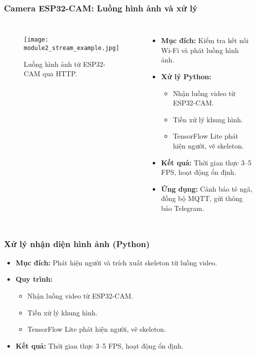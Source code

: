 \begin{frame}[t,fragile]
\frametitle{Camera ESP32-CAM: Luồng hình ảnh và xử lý}
\begin{columns}[T]
    \begin{figure}[H]
        \centering
        \texttt{[image: module2\_stream\_example.jpg]}
        \caption{Luồng hình ảnh từ ESP32-CAM qua HTTP.}
    \end{figure}

    \begin{itemize}
        \item \textbf{Mục đích:} Kiểm tra kết nối Wi-Fi và phát luồng hình ảnh.
        \item \textbf{Xử lý Python:}
        \begin{itemize}
            \item Nhận luồng video từ ESP32-CAM.
            \item Tiền xử lý khung hình.
            \item TensorFlow Lite phát hiện người, vẽ skeleton.
        \end{itemize}
        \item \textbf{Kết quả:} Thời gian thực 3–5 FPS, hoạt động ổn định.
        \item \textbf{Ứng dụng:} Cảnh báo té ngã, đồng bộ MQTT, gửi thông báo Telegram.
    \end{itemize}
\end{columns}
\end{frame}

\begin{frame}[t]
\frametitle{Xử lý nhận diện hình ảnh (Python)}
\begin{itemize}
    \item \textbf{Mục đích:} Phát hiện người và trích xuất skeleton từ luồng video.
    \item \textbf{Quy trình:}
    \begin{itemize}
        \item Nhận luồng video từ ESP32-CAM.
        \item Tiền xử lý khung hình.
        \item TensorFlow Lite phát hiện người, vẽ skeleton.
    \end{itemize}
    \item \textbf{Kết quả:} Thời gian thực 3–5 FPS, hoạt động ổn định.
\end{itemize}
\end{frame}

